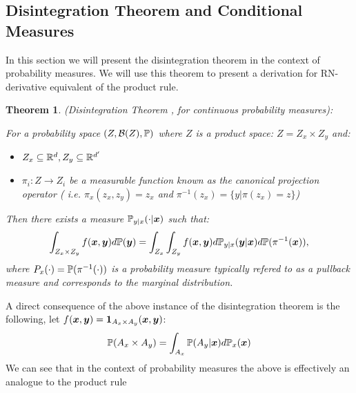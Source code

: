 \documentclass[a4paper,12pt,twoside,openright]{report}
\newtheorem{theorem}{Theorem}
\theoremstyle{definition}
\begin{document}
\subsection{Disintegration Theorem and Conditional Measures}

In this section we will present the disintegration theorem in the context of probability measures. We will use this theorem to present a derivation for RN-derivative equivalent of the product rule.

\begin{theorem} (Disintegration Theorem , for continuous probability measures): 

For a probability space $(Z, \calB(Z) ,\P)$ where $Z$ is a product space: $Z = Z_x \times Z_y$ and:
\begin{itemize}
    \item  $Z_x \subseteq \R^d, Z_y \subseteq \R^{d'}$
    \item  $\pi_i: Z \rightarrow Z_i$ be a measurable function known as the canonical projection operator ( i.e. $\pi_x(z_x,z_y) = z_x$ and $\pi^{-1}(z_x) = \{y | \pi(z_x) = z\}$)
\end{itemize}
Then there exists a measure $\P_{y|x}(\cdot | \vx)$ such that:
  \begin{align}
      \int_{Z_x \times Z_y} f(\vx, \vy) d\P(\vy) = \int_{Z_x}\int_{Z_y} f(\vx,\vy) d\P_{y|x}(\vy | \vx) d\P(\pi^{-1}(\vx)),
  \end{align}
 where $P_x(\cdot) = \P(\pi^{-1}(\cdot))$  is a probability measure typically refered to as a pullback measure and corresponds to the marginal distribution.
\end{theorem}

A direct consequence of the above instance of the disintegration theorem is the following, let $f(\vx,\vy) = \ind_{A_x \times A_y}(\vx,\vy)$:
\begin{align}
    \P(A_x \times A_y) = \int_{A_x}\P(A_y | \vx) d\P_x(\vx) 
\end{align}
 We can see that in the context of probability measures the above is effectively an analogue to the product rule 
\end{document}
